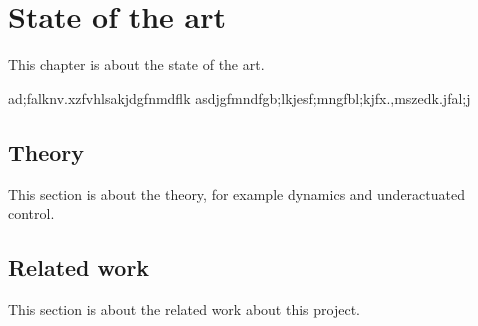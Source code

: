 \chapter{State of the art}
This chapter is about the state of the art.

ad;falknv.xzfvhlsakjdgfnmdflk asdjgfmndfgb;lkjesf;mngfbl;kjfx.,mszedk.jfal;j

\section{Theory}
This section is about the theory, for example dynamics and underactuated control.

\section{Related work}
This section is about the related work about this project.


\cleardoublepage
